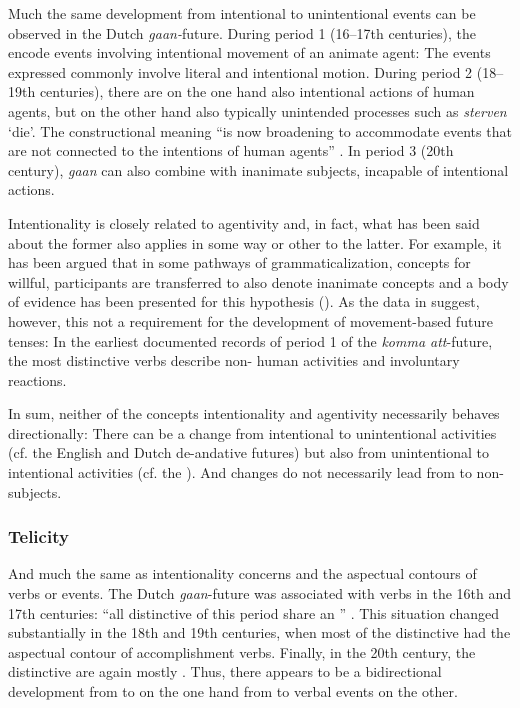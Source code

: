 \documentclass[output=paper]{langsci/langscibook}
\begin{document}
Much the same development from intentional to unintentional events can be observed in the Dutch \textit{gaan-}future. During period 1 (16--17th centuries), the  encode events involving intentional movement of an animate agent: The events expressed commonly involve literal and intentional motion. During period 2 (18--19th centuries), there are on the one hand also intentional actions of human agents, but on the other hand also typically unintended processes such as \textit{sterven} ‘die’. The constructional meaning “is now broadening to accommodate events that are not connected to the intentions of human agents” \citep[116]{Hilpert2008}. In period 3 (20th century), \textit{gaan} can also combine with inanimate subjects, incapable of intentional actions. 



Intentionality is closely related to agentivity and, in fact, what has been said about the former also applies in some way or other to the latter. For example, it has been argued that in some pathways of grammaticalization, concepts for willful,  participants are transferred to also denote inanimate concepts and a body of evidence has been presented for this hypothesis (\citealt{HeineEtAl1991,Heine1997}). As the data in  suggest, however, this not a requirement for the development of movement-based future tenses: In the earliest documented records of period 1 of the  \textit{komma att}-future, the most distinctive verbs describe non- human activities and involuntary reactions.



In sum, neither of the concepts intentionality and agentivity necessarily behaves directionally: There can be a change from intentional to unintentional activities (cf. the English and Dutch de-andative futures) but also from unintentional to intentional activities (cf. the  ). And changes do not necessarily lead from  to non- subjects.



\subsubsection{Telicity}\label{sec:heine:4.1.5}



And much the same as intentionality concerns  and the aspectual contours of verbs or events. The Dutch \textit{gaan}-future was associated with  verbs in the 16th and 17th centuries: “all distinctive  of this period share an  ” \citep[116]{Hilpert2008}. This situation changed substantially in the 18th and 19th centuries, when most of the distinctive  had the  aspectual contour of accomplishment verbs. Finally, in the 20th century, the distinctive  are again mostly  \citep[117]{Hilpert2008}. Thus, there appears to be a bidirectional development from  to  on the one hand from  to  verbal events on the other.
\end{document}
